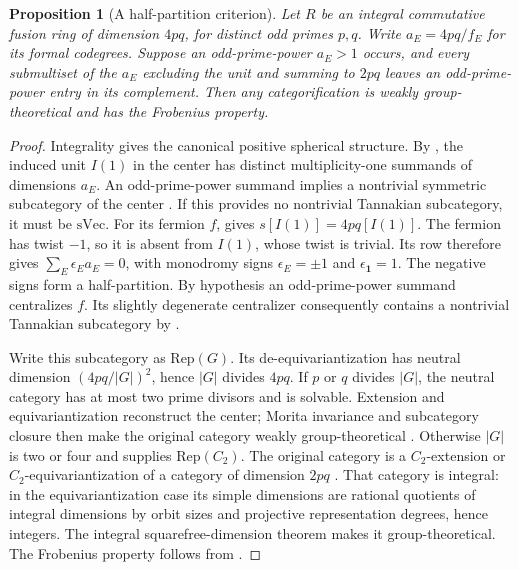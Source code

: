 \documentclass[11pt]{article}
\newtheorem{proposition}[theorem]{Proposition}
\begin{document}
\begin{proposition}[A half-partition criterion]
Let $R$ be an integral commutative fusion ring of dimension $4pq$, for
distinct odd primes $p,q$. Write $a_E=4pq/f_E$ for its formal codegrees.
Suppose an odd-prime-power $a_E>1$ occurs, and every submultiset of the
$a_E$ excluding the unit and summing to $2pq$ leaves an odd-prime-power
entry in its complement. Then any categorification is weakly
group-theoretical and has the Frobenius property.
\end{proposition}
\begin{proof}
Integrality gives the canonical positive spherical structure.
By \cite[Theorem~2.13]{OstrikRank3}, the induced unit $I(1)$ in the center
has distinct multiplicity-one summands of dimensions $a_E$.
An odd-prime-power summand implies a nontrivial symmetric subcategory
of the center \cite[Corollary~7.2]{ENOSolvable}. If this provides no
nontrivial Tannakian subcategory, it must be $\mathrm{sVec}$.
For its fermion $f$, \cite[Proposition~2.8]{OstrikRank3} gives
$s[I(1)]=4pq[I(1)]$. The fermion has twist $-1$, so it is absent from
$I(1)$, whose twist is trivial. Its row therefore gives
$\sum_E\epsilon_E a_E=0$, with monodromy signs $\epsilon_E=\pm1$
and $\epsilon_{\mathbf1}=1$. The negative signs form a half-partition.
By hypothesis an odd-prime-power summand centralizes $f$.
Its slightly degenerate centralizer consequently contains a nontrivial
Tannakian subcategory by \cite[Proposition~7.4]{ENOSolvable}.

Write this subcategory as $\mathrm{Rep}(G)$. Its de-equivariantization
has neutral dimension $(4pq/|G|)^2$, hence $|G|$ divides $4pq$.
If $p$ or $q$ divides $|G|$, the neutral category has at most two prime
divisors and is solvable. Extension and equivariantization reconstruct
the center; Morita invariance and subcategory closure then make the
original category weakly group-theoretical
\cite[Theorem~1.6 and Proposition~4.1]{ENOSolvable}.
Otherwise $|G|$ is two or four and supplies $\mathrm{Rep}(C_2)$.
The original category is a $C_2$-extension or $C_2$-equivariantization
of a category of dimension $2pq$
\cite[Propositions~2.9--2.10]{ENOSolvable}.
That category is integral: in the equivariantization case its simple
dimensions are rational quotients of integral dimensions by orbit
sizes and projective representation degrees, hence integers.
The integral squarefree-dimension theorem
\cite[Theorem~9.2]{ENOSolvable} makes it group-theoretical.
The Frobenius property follows from \cite[Theorem~1.5]{ENOSolvable}.
\end{proof}
\end{document}
